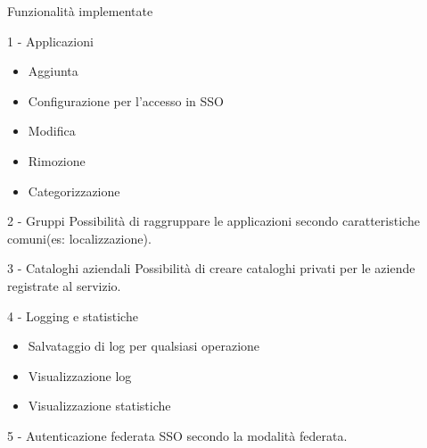 \begin{tframe}{Funzionalità implementate}
\begin{minipage}{0.45\textwidth}
\begin{block}{1 - Applicazioni}
{\fontsize{7pt}{7.2}\selectfont
\begin{itemize} 
\item Aggiunta
\item Configurazione per l'accesso in SSO
\item Modifica
\item Rimozione
\item Categorizzazione
\end{itemize}
}
\end{block}

\begin{block}{2 - Gruppi}
{\fontsize{7pt}{7.2}\selectfont
Possibilità di raggruppare le applicazioni secondo caratteristiche comuni\newline(es: localizzazione).
}
\end{block}
\end{minipage}
\hfill
\begin{minipage}{0.45\textwidth}
\begin{block}{3 - Cataloghi aziendali}
{\fontsize{7pt}{7.2}\selectfont
Possibilità di creare cataloghi privati per le aziende registrate al servizio.
}
\end{block}
\begin{block}{4 - Logging e statistiche}
{\fontsize{7pt}{7.2}\selectfont
\begin{itemize} 
\item Salvataggio di log per qualsiasi operazione
\item Visualizzazione log
\item Visualizzazione statistiche
\end{itemize}
}
\end{block}

\begin{block}{5 - Autenticazione federata}
{\fontsize{7pt}{7.2}\selectfont
SSO secondo la modalità federata.
}
\end{block}

\end{minipage}
\end{tframe}